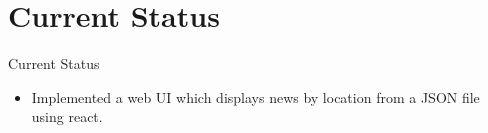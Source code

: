 \section{Current Status}
	\begin{frame}{Current Status}
	    \begin{itemize}
	        \item  \Large{Implemented a web UI which displays news by location from a JSON file using react.}
	        
	    \end{itemize}
\end{frame}